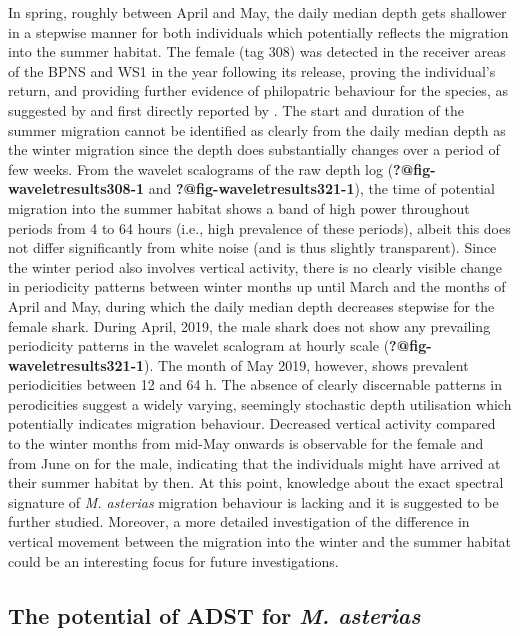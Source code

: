 \documentclass[
  authoryear,
  review,
  3p]{elsarticle}
\begin{document}
In spring, roughly between April and May, the daily median depth gets
shallower in a stepwise manner for both individuals which potentially
reflects the migration into the summer habitat. The female (tag 308) was
detected in the receiver areas of the BPNS and WS1 in the year following
its release, proving the individual's return, and providing further
evidence of philopatric behaviour for the species, as suggested by
\citet{breve_2016} and first directly reported by
\citet{griffiths_2020}. The start and duration of the summer migration
cannot be identified as clearly from the daily median depth as the
winter migration since the depth does substantially changes over a
period of few weeks. From the wavelet scalograms of the raw depth log
(\textbf{?@fig-waveletresults308-1} and
\textbf{?@fig-waveletresults321-1}), the time of potential migration
into the summer habitat shows a band of high power throughout periods
from 4 to 64 hours (i.e., high prevalence of these periods), albeit this
does not differ significantly from white noise (and is thus slightly
transparent). Since the winter period also involves vertical activity,
there is no clearly visible change in periodicity patterns between
winter months up until March and the months of April and May, during
which the daily median depth decreases stepwise for the female shark.
During April, 2019, the male shark does not show any prevailing
periodicity patterns in the wavelet scalogram at hourly scale
(\textbf{?@fig-waveletresults321-1}). The month of May 2019, however,
shows prevalent periodicities between 12 and 64 h. The absence of
clearly discernable patterns in perodicities suggest a widely varying,
seemingly stochastic depth utilisation which potentially indicates
migration behaviour. Decreased vertical activity compared to the winter
months from mid-May onwards is observable for the female and from June
on for the male, indicating that the individuals might have arrived at
their summer habitat by then. At this point, knowledge about the exact
spectral signature of \emph{M. asterias} migration behaviour is lacking
and it is suggested to be further studied. Moreover, a more detailed
investigation of the difference in vertical movement between the
migration into the winter and the summer habitat could be an interesting
focus for future investigations.

\hypertarget{sec-disc-adst}{%
\subsection{\texorpdfstring{The potential of ADST for \emph{M.
asterias}}{The potential of ADST for M. asterias}}\label{sec-disc-adst}}
\end{document}

